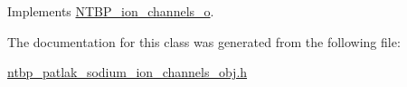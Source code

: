 Implements \hyperlink{class_n_t_b_p__ion__channels__o_a6c865e74014bef8bc9ae547e4835ec81}{NTBP\_\-ion\_\-channels\_\-o}.



The documentation for this class was generated from the following file:\begin{DoxyCompactItemize}
\item 
\hyperlink{ntbp__patlak__sodium__ion__channels__obj_8h}{ntbp\_\-patlak\_\-sodium\_\-ion\_\-channels\_\-obj.h}\end{DoxyCompactItemize}
